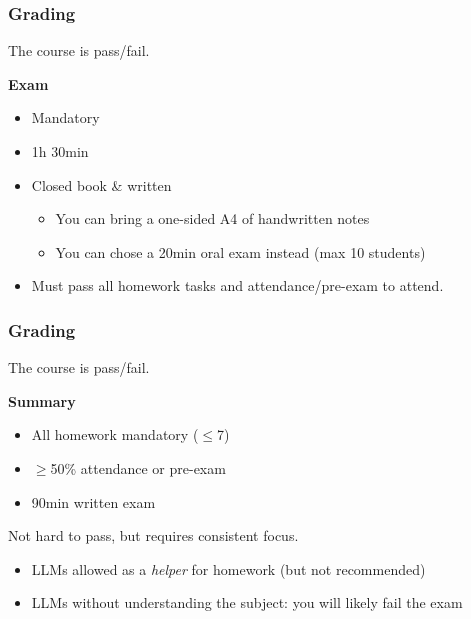 \begin{frame}
  \frametitle{Grading}

  The course is pass/fail.

  \vspace*{1em}

  \textbf{Exam}
  \begin{itemize}[<+->]
    \item Mandatory
    \item 1h 30min
    \item Closed book \& written
    \begin{itemize}[<+(1)->]
      \item You can bring a one-sided A4 of handwritten notes
      \item You can chose a 20min oral exam instead (max 10 students)
    \end{itemize}
    \item Must pass all homework tasks and attendance/pre-exam to attend.
  \end{itemize}
\end{frame}

\begin{frame}
  \frametitle{Grading}

  The course is pass/fail.

  \vspace*{1em}

  \textbf{Summary}
  \begin{itemize}[<+(1)->]
    \item All homework mandatory ($\le$7)
    \item $\ge$50\% attendance or pre-exam
    \item 90min written exam
  \end{itemize}

  \vspace*{1em}

  \pause
  Not hard to pass, but requires consistent focus.
  \begin{itemize}
    \item LLMs allowed as a \emph{helper} for homework (but not recommended)
    \item LLMs without understanding the subject: you will likely fail the exam
  \end{itemize}
\end{frame}


